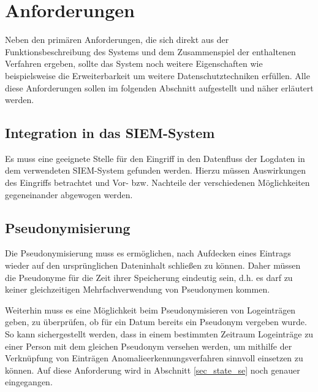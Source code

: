 \section{Anforderungen}

\label{sec_impl_requirements}

Neben den primären Anforderungen, die sich direkt aus der Funktionsbeschreibung des Systems und dem Zusammenspiel der enthaltenen Verfahren ergeben, sollte das System noch weitere Eigenschaften wie beispielsweise die Erweiterbarkeit um weitere Datenschutztechniken erfüllen. Alle diese Anforderungen sollen im folgenden Abschnitt aufgestellt und näher erläutert werden.

\subsection{Integration in das SIEM-System}

\label{subsec_impl_requirements_ossimintegration}

Es muss eine geeignete Stelle für den Eingriff in den Datenfluss der Logdaten in dem verwendeten SIEM-System gefunden werden. Hierzu müssen Auswirkungen des Eingriffs betrachtet und Vor- bzw. Nachteile der verschiedenen Möglichkeiten gegeneinander abgewogen werden. 

\subsection{Pseudonymisierung}

\label{subsec_impl_requirements_pseudonymity}


Die Pseudonymisierung muss es ermöglichen, nach Aufdecken eines Eintrags wieder auf den ursprünglichen Dateninhalt schließen zu können. Daher müssen die Pseudonyme für die Zeit ihrer Speicherung eindeutig sein, d.h. es darf zu keiner gleichzeitigen Mehrfachverwendung von Pseudonymen kommen. 

Weiterhin muss es eine Möglichkeit beim Pseudonymisieren von Logeinträgen geben, zu überprüfen, ob für ein Datum bereits ein Pseudonym vergeben wurde. So kann sichergestellt werden, dass in einem bestimmten Zeitraum Logeinträge zu einer Person mit dem gleichen Pseudonym versehen werden, um mithilfe der Verknüpfung von Einträgen Anomalieerkennungsverfahren sinnvoll einsetzen zu können. Auf diese Anforderung wird in Abschnitt \ref{sec_state_se} noch genauer eingegangen.

